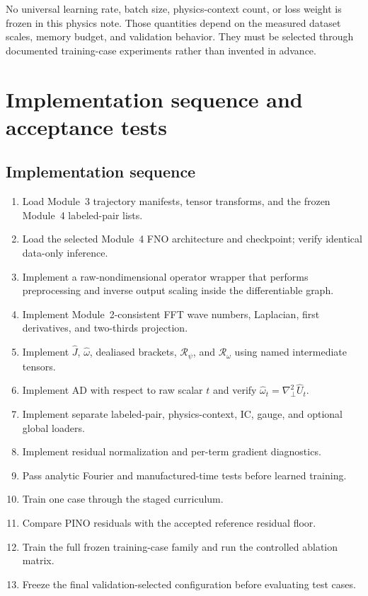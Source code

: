 \documentclass[11pt]{article}
\newcommand{\Lap}{\nabla_\perp^2}
\newcommand{\Rpsi}{\mathcal{R}_{\psi}}
\newcommand{\Romega}{\mathcal{R}_{\omega}}
\begin{document}
No universal learning rate, batch size, physics-context count, or loss weight is frozen in this physics note. Those quantities depend on the measured dataset scales, memory budget, and validation behavior. They must be selected through documented training-case experiments rather than invented in advance.

\section{Implementation sequence and acceptance tests}
\label{sec:acceptance}

\subsection{Implementation sequence}
\begin{enumerate}[label=\textbf{M5.\arabic*.}]
  \item Load Module~3 trajectory manifests, tensor transforms, and the frozen Module~4 labeled-pair lists.
  \item Load the selected Module~4 FNO architecture and checkpoint; verify identical data-only inference.
  \item Implement a raw-nondimensional operator wrapper that performs preprocessing and inverse output scaling inside the differentiable graph.
  \item Implement Module~2-consistent FFT wave numbers, Laplacian, first derivatives, and two-thirds projection.
  \item Implement $\widehat J$, $\widehat\omega$, dealiased brackets, $\Rpsi$, and $\Romega$ using named intermediate tensors.
  \item Implement AD with respect to raw scalar $t$ and verify $\widehat\omega_t=\Lap\widehat U_t$.
  \item Implement separate labeled-pair, physics-context, IC, gauge, and optional global loaders.
  \item Implement residual normalization and per-term gradient diagnostics.
  \item Pass analytic Fourier and manufactured-time tests before learned training.
  \item Train one case through the staged curriculum.
  \item Compare PINO residuals with the accepted reference residual floor.
  \item Train the full frozen training-case family and run the controlled ablation matrix.
  \item Freeze the final validation-selected configuration before evaluating test cases.
\end{enumerate}
\end{document}
